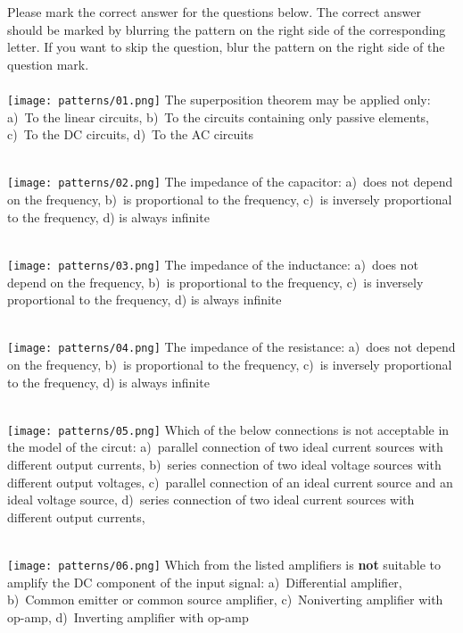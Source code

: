\documentclass[11pt]{article}
\begin{document}
\noindent
Please mark the correct answer for the questions below.
The correct answer should be marked
by blurring the pattern on the right side of the corresponding letter.
If you want to skip the question, blur the pattern on the right side
of the question mark.\\
~\\
\texttt{[image: patterns/01.png]}
The superposition theorem may be applied only: a)~To the linear circuits,
b)~To the circuits containing only passive elements,
c)~To the DC circuits,
d)~To the AC circuits

~\\

\texttt{[image: patterns/02.png]}
The impedance of the capacitor: a)~does not depend on the frequency,
b)~is proportional to the frequency, c)~is inversely proportional to the
frequency, d) is always infinite

~\\

\texttt{[image: patterns/03.png]}
The impedance of the inductance: a)~does not depend on the frequency,
b)~is proportional to the frequency, c)~is inversely proportional to the
frequency, d) is always infinite

~\\

\texttt{[image: patterns/04.png]}
The impedance of the resistance: a)~does not depend on the frequency,
b)~is proportional to the frequency, c)~is inversely proportional to the
frequency, d) is always infinite

~\\

\texttt{[image: patterns/05.png]}
Which of the below connections is not acceptable in the model of the circut:
  a)~parallel connection of two ideal current sources with different output currents,
  b)~series connection of two ideal voltage sources with different output voltages,
  c)~parallel connection of an ideal current source and an ideal voltage source,
  d)~series connection of two ideal current sources with different output currents,


~\\

\texttt{[image: patterns/06.png]}
 Which from the listed amplifiers is {\bf not} suitable to amplify the DC component of the
 input signal:
 a)~Differential amplifier,
 b)~Common emitter or common source amplifier,
 c)~Noniverting amplifier with op-amp,
 d)~Inverting amplifier with op-amp
\end{document}
